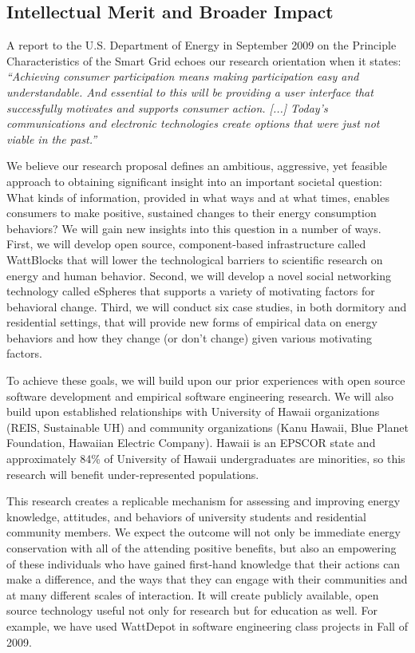 \subsection{Intellectual Merit and Broader Impact}
\label{sec:merit}

A report to the U.S. Department of Energy in September 2009 on the
Principle Characteristics of the Smart Grid echoes our research orientation
when it states: {\em ``Achieving consumer participation means
  making participation easy and understandable.  And essential to this will
  be providing a user interface that successfully motivates and supports
  consumer action. [...] Today's communications and electronic technologies
  create options that were just not viable in the past.''}
\cite{NETL:EnablesActiveParticipation}

We believe our research proposal defines an ambitious, aggressive, yet
feasible approach to obtaining significant insight into an important
societal question: What kinds of information, provided in what ways and at
what times, enables consumers to make positive, sustained changes to their
energy consumption behaviors?  We will gain new insights into this question
in a number of ways.  First, we will develop open source, component-based
infrastructure called WattBlocks that will lower the technological barriers
to scientific research on energy and human behavior.  Second, we will
develop a novel social networking technology called eSpheres that supports
a variety of motivating factors for behavioral change.  Third, we will
conduct six case studies, in both dormitory and residential settings, that
will provide new forms of empirical data on energy behaviors and how they
change (or don't change) given various motivating factors.

To achieve these goals, we will build upon our prior experiences with open
source software development and empirical software engineering research. We
will also build upon established relationships with University of Hawaii
organizations (REIS, Sustainable UH) and community organizations (Kanu
Hawaii, Blue Planet Foundation, Hawaiian Electric Company).  Hawaii
is an EPSCOR state and approximately 84\% of University of Hawaii
undergraduates are minorities, so this research will benefit
under-represented populations. 

This research creates a replicable mechanism for assessing and improving
energy knowledge, attitudes, and behaviors of university students and
residential community members. We expect the outcome will not only be
immediate energy conservation with all of the attending positive benefits,
but also an empowering of these individuals who have gained first-hand
knowledge that their actions can make a difference, and the ways that they
can engage with their communities and at many different scales of
interaction.  It will create publicly available, open source technology
useful not only for research but for education as well.  For example, we
have used WattDepot in software engineering class projects in Fall of 2009.

